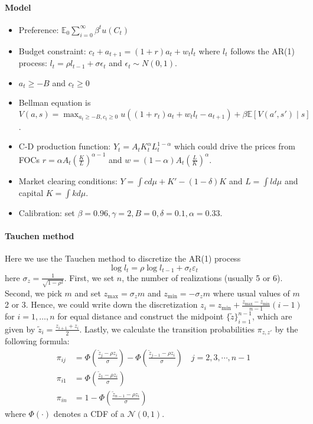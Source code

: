 \documentclass[11pt,a4paper]{article}
\begin{document}
\paragraph{Model\citep{Aiyagari1994}}
\begin{itemize}
    \item Preference: $\mathbb{E}_0\sum_{i=0}^\infty \beta^t u(C_t)$ 
    \item Budget constraint: $c_t + a_{t+1} = (1+r)a_t + w_t l_t$ where $l_t$ follows the AR(1) process: $l_t = \rho l_{t-1}+\sigma\epsilon_t$ and $\epsilon_t \sim N(0,1)$. 
    \item $a_t \geq -B$ and $c_t\geq 0$
    \item Bellman equation is $V(a,s) = \max_{a_t\geq -B,c_t\geq 0 } u((1+r_t)a_t+w_t l_t-a_{t+1})+ \beta \mathbb{E}[V(a',s')\mid s]$.
    \item C-D production function: $Y_t = A_t K^\alpha_t L^{1-\alpha}_t$ which could drive the prices from FOCs $r = \alpha A_t\left(\frac{K}{L}\right)^{\alpha-1}$ and $w = (1-\alpha )A_t \left(\frac{L}{K}\right)^{\alpha }$. 
    \item Market clearing conditions: $Y = \int c d\mu + K' -(1-\delta )K$ and $L = \int l d\mu$ and capital $K = \int k d\mu$. 
    \item Calibration: set $\beta = 0.96,\gamma=2,B=0,\delta = 0.1,\alpha=0.33$. 
\end{itemize}

\paragraph{Tauchen method} Here we use the Tauchen method to discretize the AR(1) process $$ \log l_t = \rho \log l_{t-1}+\sigma_t \varepsilon_t $$
here $\sigma_z = \frac{1}{\sqrt{1-\rho^2}}$. First, we set $n$, the number of realizations (usually 5 or 6). Second, we pick $m$ and set $z_{\max} = \sigma_z m$ and $z_{\min} = -\sigma_z m$ where usual values of $m$ 2 or 3. Hence, we could write down the discretization $z_i=z_{\min} + \frac{z_{\max}-z_{\min}}{n-1}(i-1)$ for $i=1,\ldots,n$ for equal distance and construct the midpoint $\{\tilde{z}\}_{i=1}^{n-1}$, which are given by $\tilde{z}_i = \frac{z_{i+1}+z_i}{2}$. Lastly, we calculate the transition probabilities $\pi_{z,z'}$ by the following formula: 
\begin{equation}
    \begin{aligned}
        \pi_{ij} &= \Phi \left(\frac{\tilde{z}_j-\rho z_i}{\sigma}\right)- \Phi \left(\frac{\tilde{z}_{j-1}-\rho z_i}{\sigma}\right) \quad j=2,3,\cdots,n-1\\ 
        \pi_{i1} &= \Phi \left(\frac{\tilde{z}_1-\rho z_i}{\sigma}\right)\\
        \pi_{in} &= 1 - \Phi \left(\frac{\tilde{z}_{n-1}-\rho z_i}{\sigma}\right)
    \end{aligned}
\end{equation}
where $\Phi(\cdot)$ denotes a CDF of a $\mathcal{N}(0,1)$. 
\end{document}
